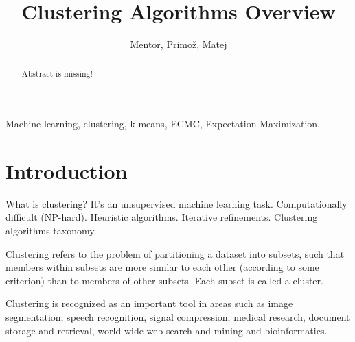 \documentclass[conference]{IEEEtran}
\begin{document}
\title{Clustering Algorithms Overview}
\author{Mentor, Primož, Matej}
\maketitle

\begin{abstract}
Abstract is missing!
\end{abstract}

\begin{IEEEkeywords}
Machine learning, clustering, k-means, ECMC, Expectation Maximization.
\end{IEEEkeywords}

\section{Introduction}
What is clustering? It's an unsupervised machine learning task. Computationally difficult
(NP-hard). Heuristic algorithms. Iterative refinements. Clustering algorithms taxonomy.

Clustering refers to the problem of partitioning a dataset into subsets, such that members
within subsets are more similar to each other (according to some criterion) than to members
of other subsets. Each subset is called a cluster.

Clustering is recognized as an important tool in areas such as image segmentation,
speech recognition, signal compression, medical research, document storage and retrieval,
world-wide-web search and mining and bioinformatics.
\end{document}
